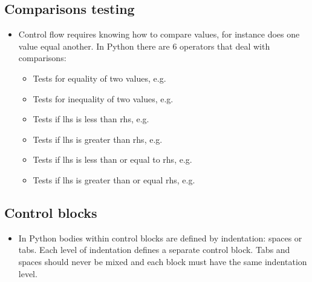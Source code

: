 \documentclass[letterpaper,10pt,english,openany]{sphinxmanual}
\begin{document}
\subsection{Comparisons testing}
\label{\detokenize{introduction_to_python/control_structures:comparisons-testing}}\begin{itemize}
\item {} 
Control flow requires knowing how to compare values, for instance
does one value equal another. In Python there are 6 operators that
deal with comparisons:
\begin{itemize}
\item {} 
\sphinxcode{\sphinxupquote{==}} Tests for equality of two values, e.g. 

\item {} 
\sphinxcode{\sphinxupquote{!=}} Tests for inequality of two values, e.g. 

\item {} 
\sphinxcode{\sphinxupquote{\textless{}}} Tests if lhs is less than rhs, e.g. 

\item {} 
\sphinxcode{\sphinxupquote{\textgreater{}}} Tests if lhs is greater than rhs, e.g. 

\item {} 
\sphinxcode{\sphinxupquote{\textless{}=}} Tests if lhs is less than or equal to rhs, e.g. 

\item {} 
\sphinxcode{\sphinxupquote{\textgreater{}=}} Tests if lhs is greater than or equal rhs, e.g. 

\end{itemize}

\end{itemize}

\begin{DUlineblock}{0em}
\item[] 
\end{DUlineblock}


\subsection{Control blocks}
\label{\detokenize{introduction_to_python/control_structures:control-blocks}}\begin{itemize}
\item {} 
In Python bodies within control blocks are defined by indentation:
spaces or tabs. Each level of indentation defines a separate control
block. Tabs and spaces should never be mixed and each block must have
the same indentation level.

\end{itemize}
\end{document}

